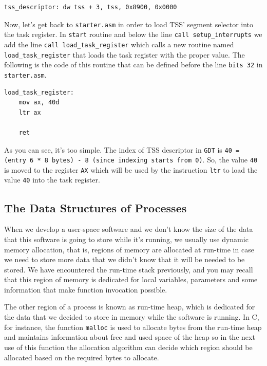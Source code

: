 \begin{lstlisting}
tss_descriptor: dw tss + 3, tss, 0x8900, 0x0000
\end{lstlisting}

Now, let's get back to \lstinline!starter.asm! in order to load TSS'
segment selector into the task register. In \lstinline!start! routine
and below the line \lstinline!call setup_interrupts! we add the line
\lstinline!call load_task_register! which calls a new routine named
\lstinline!load_task_register! that loads the task register with the
proper value. The following is the code of this routine that can be
defined before the line \lstinline!bits 32! in \lstinline!starter.asm!.

\begin{lstlisting}
load_task_register:
    mov ax, 40d
    ltr ax
    
    ret
\end{lstlisting}

As you can see, it's too simple. The index of TSS descriptor in
\lstinline!GDT! is
\lstinline!40 = (entry 6 * 8 bytes) - 8 (since indexing starts from 0)!.
So, the value \lstinline!40! is moved to the register \lstinline!AX!
which will be used by the instruction \lstinline!ltr! to load the value
\lstinline!40! into the task register.

\subsection{The Data Structures of
Processes}\label{the-data-structures-of-processes}

When we develop a user-space software and we don't know the size of the
data that this software is going to store while it's running, we usually
use dynamic memory allocation, that is, regions of memory are allocated
at run-time in case we need to store more data that we didn't know that
it will be needed to be stored. We have encountered the run-time stack
previously, and you may recall that this region of memory is dedicated
for local variables, parameters and some information that make function
invocation possible.

The other region of a process is known as run-time heap, which is
dedicated for the data that we decided to store in memory while the
software is running. In C, for instance, the function \lstinline!malloc!
is used to allocate bytes from the run-time heap and maintains
information about free and used space of the heap so in the next use of
this function the allocation algorithm can decide which region should be
allocated based on the required bytes to allocate.

